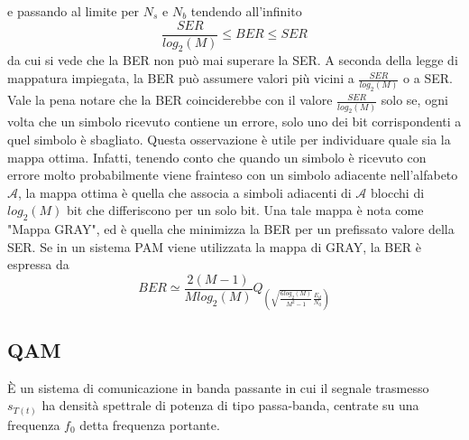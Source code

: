             e passando al limite per $N_s$ e $N_b$ tendendo all'infinito 
            \[
                \frac{SER}{log_2(M)} \leq BER \leq SER    
            \]
            da cui si vede che la BER non può mai superare la SER. A seconda della legge di mappatura impiegata,
            la BER può assumere valori più vicini a $\frac{SER}{log_2(M)}$ o a SER. Vale la pena notare che la BER 
            coinciderebbe con il valore $\frac{SER}{log_2(M)}$ solo se, ogni volta che un simbolo ricevuto contiene 
            un errore, solo uno dei bit corrispondenti a quel simbolo è sbagliato. Questa osservazione è utile 
            per individuare quale sia la mappa ottima. Infatti, tenendo conto che quando un simbolo è ricevuto con errore
            molto probabilmente viene frainteso con un simbolo adiacente nell'alfabeto $\mathcal{A}$, la mappa ottima è 
            quella che associa a simboli adiacenti di $\mathcal{A}$ blocchi di $log_2(M)$ bit che differiscono per un solo bit. 
            Una tale mappa è nota come "Mappa GRAY", ed è quella che minimizza la BER per un prefissato valore della SER. 
            Se in un sistema PAM viene utilizzata la mappa di GRAY, la BER è espressa da 
            \[
                BER \simeq \frac{2(M-1)}{Mlog_2(M)}Q_{\displaystyle \left(\sqrt{\frac{6log_2(M)}{M^2-1}}\frac{E_d}{N_0}\right)}    
            \] 
    \subsection{QAM}
        È un sistema di comunicazione in {\color{red}banda passante} in cui il segnale trasmesso $s_{T(t)}$ ha densità 
        spettrale di potenza di tipo passa-banda, centrate su una frequenza $f_0$ detta frequenza portante.
